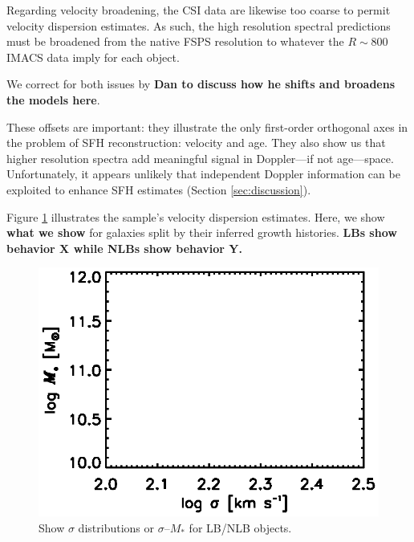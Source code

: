 \documentclass[a4paper,fleqn,usenatbib]{mnras}
\newcommand{\Mstel}{M_\ast}
\newcommand{\bfr}{\bf\color{red}}
\newcommand{\bfb}{\color{myblue}}
\begin{document}
Regarding velocity broadening, the CSI data are likewise too coarse to permit velocity
dispersion estimates. As such, the high resolution spectral predictions
must be broadened from the native FSPS resolution to whatever the $R\sim800$ IMACS data imply
for each object. 

We correct for both issues by {\bfr Dan to discuss how he shifts and broadens the models here}.

These offsets are important: they illustrate the only first-order orthogonal axes in the problem of SFH 
reconstruction: velocity and age. They also show us that higher resolution spectra add meaningful 
signal in Doppler---if not age---space. Unfortunately, it appears unlikely that independent Doppler
information can be exploited to enhance SFH estimates (Section \ref{sec:discussion}). 

Figure \ref{fig:disp} illustrates the sample's velocity dispersion estimates. Here, we show {\bfr what 
we show} for galaxies split by their inferred growth histories. {\bfr LBs show behavior X while NLBs
show behavior Y.} %

\begin{figure}
\centering
\includegraphics[scale = 0.9, trim = 1cm 0cm 0cm 0cm]{disp}
\caption{\bfb Show $\sigma$ distributions or $\sigma$--$\Mstel$ for LB/NLB objects.}
\label{fig:disp}
\end{figure}
\end{document}
